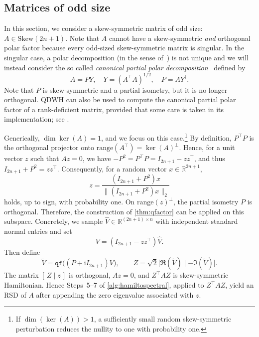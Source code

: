 \documentclass[final,onefignum,onetabnum,dvipsnames]{siamart251216}
\numberwithin{algorithm}{section}
\numberwithin{equation}{section}
\begin{document}
\subsection{Matrices of odd size}\label{sec:odd} 


In this section, we consider a skew-symmetric matrix of odd size: $A\in\mathrm{Skew}(2n+1)$. Note that $A$ cannot have a skew-symmetric \emph{and} orthogonal polar factor because every odd-sized
skew-symmetric matrix is singular. In the singular case, a polar decomposition (in the sense of~) is not unique and we will instead consider the so called \emph{canonical partial polar decomposition}~\cite[Theorem 8.3]{Higham2008} defined by
\[
 A = P Y, \quad Y = (A^\top A)^{1/2}, \quad P = A Y^\dagger.
\]
Note that $P$ is skew-symmetric and a partial isometry, but it is no longer orthogonal.
QDWH can also be used to compute the canonical partial polar factor
of a rank-deficient matrix, provided that some care is taken in its implementation; see \cite[Secs.~5.4--5.5]{NakatsukasaHigham2013}.

Generically, $\dim\ker(A)=1$, and we focus on this case.\footnote{If $\dim(\ker(A))>1$, a sufficiently small random
skew-symmetric perturbation reduces the nullity to one with probability one.}
 By definition, 
$P^\top P$ is the orthogonal projector onto $\mathrm{range}(A^\top)
=\ker(A)^\perp$. Hence, for a unit vector $z$ such that $Az = 0$, we have 
$-P^2=P^\top P=I_{2n+1}-zz^\top$,
and thus $I_{2n+1}+P^2=zz^\top$.
Consequently, for a random vector $x\in\mathbb R^{2n+1}$,
\[
    z=
    \frac{(I_{2n+1}+P^2)x}
         {\|(I_{2n+1}+P^2)x\|_2}
\]
holds, up to sign, with probability one.
On $\text{range}(z)^\perp$, the partial isometry $P$ is orthogonal. Therefore, the construction of \cref{thm:qfactor} can be
applied on this subspace. Concretely, we sample
$\widehat V\in\mathbb R^{(2n+1)\times n}$ with independent standard
normal entries and set
\[
    V=(I_{2n+1}-zz^\top)\widehat V.
\]
Then define
\[
    \widetilde V
    =\texttt{qf}\bigl((P+\mathrm{i}I_{2n+1})V\bigr),
    \qquad
    Z=\sqrt{2}
    \bigl[\Re(\widetilde V)\mid-\Im(\widetilde V)\bigr].
\]
The matrix $[\,Z\mid z\,]$ is orthogonal, $Az=0$, and
$Z^\top AZ$ is skew-symmetric Hamiltonian. Hence Steps~5--7 of
\cref{alg:hamiltospectral}, applied to $Z^\top AZ$, yield an RSD of
$A$ after appending the zero eigenvalue associated with $z$.
\end{document}
